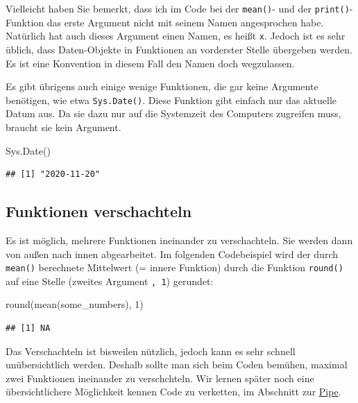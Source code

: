 \documentclass[
]{book}
\newenvironment{Shaded}{\begin{snugshade}}{\end{snugshade}}
\newcommand{\DecValTok}[1]{\textcolor[rgb]{0.00,0.00,0.81}{#1}}
\newcommand{\FunctionTok}[1]{\textcolor[rgb]{0.00,0.00,0.00}{#1}}
\newcommand{\NormalTok}[1]{#1}
\begin{document}
Vielleicht haben Sie bemerkt, dass ich im Code bei der \texttt{mean()}- und der \texttt{print()}-Funktion das erste Argument nicht mit seinem Namen angesprochen habe. Natürlich hat auch dieses Argument einen Namen, es heißt \texttt{x}. Jedoch ist es sehr üblich, dass Daten-Objekte in Funktionen an vorderster Stelle übergeben werden. Es ist eine Konvention in diesem Fall den Namen doch wegzulassen.

Es gibt übrigens auch einige wenige Funktionen, die gar keine Argumente benötigen, wie etwa \texttt{Sys.Date()}. Diese Funktion gibt einfach nur das aktuelle Datum aus. Da sie dazu nur auf die Systemzeit des Computers zugreifen muss, braucht sie kein Argument.

\begin{Shaded}
\begin{Highlighting}[]
\FunctionTok{Sys.Date}\NormalTok{()}
\end{Highlighting}
\end{Shaded}

\begin{verbatim}
## [1] "2020-11-20"
\end{verbatim}

\hypertarget{funktionen-verschachteln}{%
\subsection{Funktionen verschachteln}\label{funktionen-verschachteln}}

Es ist möglich, mehrere Funktionen ineinander zu verschachteln. Sie werden dann von außen nach innen abgearbeitet. Im folgenden Codebeispiel wird der durch \texttt{mean()} berechnete Mittelwert (= innere Funktion) durch die Funktion \texttt{round()} auf eine Stelle (zweites Argument \texttt{,\ 1}) gerundet:

\begin{Shaded}
\begin{Highlighting}[]
\FunctionTok{round}\NormalTok{(}\FunctionTok{mean}\NormalTok{(some\_numbers), }\DecValTok{1}\NormalTok{)}
\end{Highlighting}
\end{Shaded}

\begin{verbatim}
## [1] NA
\end{verbatim}

Das Verschachteln ist bisweilen nützlich, jedoch kann es sehr schnell unübersichtlich werden. Deshalb sollte man sich beim Coden bemühen, maximal zwei Funktionen ineinander zu verschchteln. Wir lernen später noch eine übersichtlichere Möglichkeit kennen Code zu verketten, im Abschnitt zur \protect\hyperlink{pipe}{Pipe}.
\end{document}
